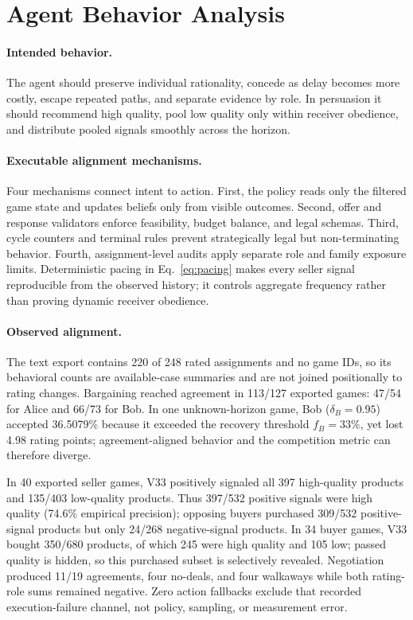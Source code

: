 \section{Agent Behavior Analysis}
\label{sec:behavior}

\paragraph{Intended behavior.}
The agent should preserve individual rationality, concede as delay becomes more
costly, escape repeated paths, and separate evidence by role. In persuasion it
should recommend high quality, pool low quality only within receiver obedience,
and distribute pooled signals smoothly across the horizon.

\paragraph{Executable alignment mechanisms.}
Four mechanisms connect intent to action. First, the policy reads only the
filtered game state and updates beliefs only from visible outcomes. Second,
offer and response validators enforce feasibility, budget balance, and legal
schemas. Third, cycle counters and terminal rules prevent strategically legal
but non-terminating behavior. Fourth, assignment-level audits apply separate
role and family exposure limits. Deterministic pacing in Eq.~\ref{eq:pacing}
makes every seller signal reproducible from the observed history; it controls
aggregate frequency rather than proving dynamic receiver obedience.

\paragraph{Observed alignment.}
The text export contains 220 of 248 rated assignments and no game IDs, so its
behavioral counts are available-case summaries and are not joined positionally
to rating changes. Bargaining reached agreement in 113/127 exported games:
47/54 for Alice and 66/73 for Bob. In one unknown-horizon game, Bob
($\delta_B=0.95$) accepted 36.5079\% because it exceeded the recovery threshold
$f_B=33\%$, yet lost 4.98 rating points; agreement-aligned behavior and the
competition metric can therefore diverge.

In 40 exported seller games, V33 positively signaled all 397 high-quality
products and 135/403 low-quality products. Thus 397/532 positive signals were
high quality (74.6\% empirical precision); opposing buyers purchased 309/532
positive-signal products but only 24/268 negative-signal products. In 34 buyer
games, V33 bought 350/680 products, of which 245 were high quality and 105 low;
passed quality is hidden, so this purchased subset is selectively revealed.
Negotiation produced 11/19 agreements, four no-deals, and four walkaways while
both rating-role sums remained negative. Zero action fallbacks exclude that
recorded execution-failure channel, not policy, sampling, or measurement error.

